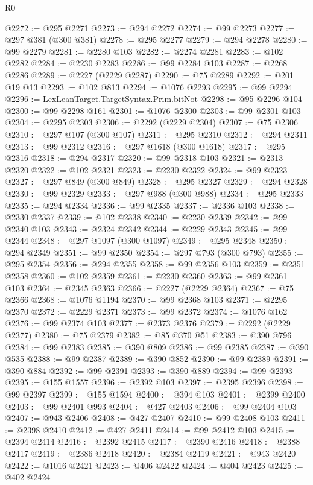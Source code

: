 \begin{lexlean}{R0}
\begin{coremodule}
@2272 := @295 @2271
@2273 := @294 @2272
@2274 := @99 @2273
@2277 := @297 @381 (@300 @381)
@2278 := @295 @2277
@2279 := @294 @2278
@2280 := @99 @2279
@2281 := @2280 @103
@2282 := @2274 @2281
@2283 := @102 @2282
@2284 := @2230 @2283
@2286 := @99 @2284 @103
@2287 := @2268 @2286
@2289 := @2227 (@2229 @2287)
@2290 := @75 @2289
@2292 := @201 @19 @13
@2293 := @102 @813
@2294 := @1076 @2293
@2295 := @99 @2294
@2296 := LexLeanTarget.TargetSyntax.Prim.bitNot
@2298 := @95 @2296 @104
@2300 := @99 @2298 @161
@2301 := @1076 @2300
@2303 := @99 @2301 @103
@2304 := @2295 @2303
@2306 := @2292 (@2229 @2304)
@2307 := @75 @2306
@2310 := @297 @107 (@300 @107)
@2311 := @295 @2310
@2312 := @294 @2311
@2313 := @99 @2312
@2316 := @297 @1618 (@300 @1618)
@2317 := @295 @2316
@2318 := @294 @2317
@2320 := @99 @2318 @103
@2321 := @2313 @2320
@2322 := @102 @2321
@2323 := @2230 @2322
@2324 := @99 @2323
@2327 := @297 @849 (@300 @849)
@2328 := @295 @2327
@2329 := @294 @2328
@2330 := @99 @2329
@2333 := @297 @988 (@300 @988)
@2334 := @295 @2333
@2335 := @294 @2334
@2336 := @99 @2335
@2337 := @2336 @103
@2338 := @2330 @2337
@2339 := @102 @2338
@2340 := @2230 @2339
@2342 := @99 @2340 @103
@2343 := @2324 @2342
@2344 := @2229 @2343
@2345 := @99 @2344
@2348 := @297 @1097 (@300 @1097)
@2349 := @295 @2348
@2350 := @294 @2349
@2351 := @99 @2350
@2354 := @297 @793 (@300 @793)
@2355 := @295 @2354
@2356 := @294 @2355
@2358 := @99 @2356 @103
@2359 := @2351 @2358
@2360 := @102 @2359
@2361 := @2230 @2360
@2363 := @99 @2361 @103
@2364 := @2345 @2363
@2366 := @2227 (@2229 @2364)
@2367 := @75 @2366
@2368 := @1076 @1194
@2370 := @99 @2368 @103
@2371 := @2295 @2370
@2372 := @2229 @2371
@2373 := @99 @2372
@2374 := @1076 @162
@2376 := @99 @2374 @103
@2377 := @2373 @2376
@2379 := @2292 (@2229 @2377)
@2380 := @75 @2379
@2382 := @85 @370 @51
@2383 := @390 @796
@2384 := @99 @2383
@2385 := @390 @809
@2386 := @99 @2385
@2387 := @390 @535
@2388 := @99 @2387
@2389 := @390 @852
@2390 := @99 @2389
@2391 := @390 @884
@2392 := @99 @2391
@2393 := @390 @889
@2394 := @99 @2393
@2395 := @155 @1557
@2396 := @2392 @103
@2397 := @2395 @2396
@2398 := @99 @2397
@2399 := @155 @1594
@2400 := @394 @103
@2401 := @2399 @2400
@2403 := @99 @2401 @993
@2404 := @427 @2403
@2406 := @99 @2404 @103
@2407 := @943 @2406
@2408 := @427 @2407
@2410 := @99 @2408 @103
@2411 := @2398 @2410
@2412 := @427 @2411
@2414 := @99 @2412 @103
@2415 := @2394 @2414
@2416 := @2392 @2415
@2417 := @2390 @2416
@2418 := @2388 @2417
@2419 := @2386 @2418
@2420 := @2384 @2419
@2421 := @943 @2420
@2422 := @1016 @2421
@2423 := @406 @2422
@2424 := @404 @2423
@2425 := @402 @2424

\end{coremodule}
\end{lexlean}
